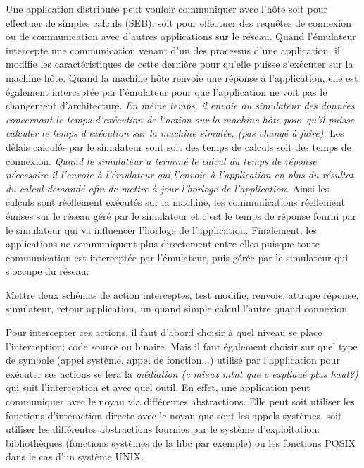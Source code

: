  Une application distribuée peut vouloir communiquer avec l'hôte soit pour
 effectuer de simples calculs (SEB), soit pour effectuer des requêtes de
 connexion ou de communication avec d'autres applications sur le réseau. Quand
 l'émulateur intercepte une communication venant d'un des processus d'une
 application, il modifie les caractéristiques de cette dernière pour qu'elle
 puisse s'exécuter sur la machine hôte. Quand la machine hôte renvoie une
 réponse à l'application, elle est également interceptée par l'émulateur pour
 que l'application ne voit pas le changement d'architecture. \textit{En même
   temps, il envoie au simulateur des données concernant le temps d'exécution de
   l'action sur la machine hôte pour qu'il puisse calculer le temps d'exécution
   sur la machine simulée, {\color{red} (pas changé à faire)}}. Les délais
 calculés par le simulateur sont soit des temps de calculs soit des temps de
 connexion. \textit{Quand le simulateur a terminé le calcul du temps de réponse
   nécessaire il l'envoie à l'émulateur qui l'envoie à l'application en plus du
   résultat du calcul demandé afin de mettre à jour l'horloge de l'application.}
 Ainsi les calculs sont réellement exécutés sur la machine, les communications
 réellement émises sur le réseau géré par le simulateur et c'est le temps de
 réponse fourni par le simulateur qui va influencer l'horloge de
 l'application. Finalement, les applications ne communiquent plus directement
 entre elles puisque toute communication est interceptée par l'émulateur, puis
 gérée par le simulateur qui s'occupe du réseau.

{\color{red} Mettre deux schémas de action interceptes, test modifie, renvoie,
  attrape réponse, simulateur, retour application, un quand simple calcul
  l'autre quand connexion}

Pour intercepter ces actions, il faut d'abord choisir à quel niveau se place
l'interception: code source ou binaire. Mais il faut également choisir sur quel
type de symbole (appel système, appel de fonction...) utilisé par l'application
pour exécuter ses actions se fera la \textit{médiation {\color{red} (c mieux
    mtnt que c expliaué plus haut?)}} qui suit l'interception et avec quel
outil. En effet, une application peut communiquer avec le noyau via différentes
abstractions. Elle peut soit utiliser les fonctions d'interaction directe avec
le noyau que sont les appels systèmes, soit utiliser les différentes
abstractions fournies par le système d'exploitation: bibliothèques (fonctions
systèmes de la libc par exemple) ou les fonctions POSIX dans le cas d'un système
UNIX.

